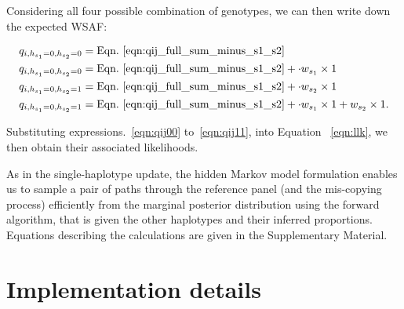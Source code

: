 \documentclass{nature}
\begin{document}
\noindent Considering all four possible combination of genotypes, we can then write down the expected WSAF:

\begin{align}
q_{i,h_{s_1}=0,h_{s_2}=0} & = \textrm{Eqn.~\eqref{eqn:qij_full_sum_minus_s1_s2}} \label{eqn:qij00}\\
q_{i,h_{s_1}=0,h_{s_2}=0} & = \textrm{Eqn.~\eqref{eqn:qij_full_sum_minus_s1_s2}} + \cdot w_{s_1} \times 1 \label{eqn:qij10}\\
q_{i,h_{s_1}=0,h_{s_2}=1} & = \textrm{Eqn.~\eqref{eqn:qij_full_sum_minus_s1_s2}} + \cdot w_{s_2} \times 1 \label{eqn:qij01}\\
q_{i,h_{s_1}=0,h_{s_2}=1} & = \textrm{Eqn.~\eqref{eqn:qij_full_sum_minus_s1_s2}} + \cdot w_{s_1} \times 1 + w_{s_2} \times 1 \label{eqn:qij11}.
\end{align}

\noindent Substituting expressions.~\eqref{eqn:qij00} to~\eqref{eqn:qij11}, into Equation ~\eqref{eqn:llk}, we then obtain their associated likelihoods.

As in the single-haplotype update, the hidden Markov model formulation enables us to sample a pair of paths through the reference panel (and the mis-copying process) efficiently from the marginal posterior distribution using the forward algorithm, that is given the other haplotypes and their inferred proportions.  Equations describing the calculations are given in the Supplementary Material.


\section*{Implementation details}
\end{document}
